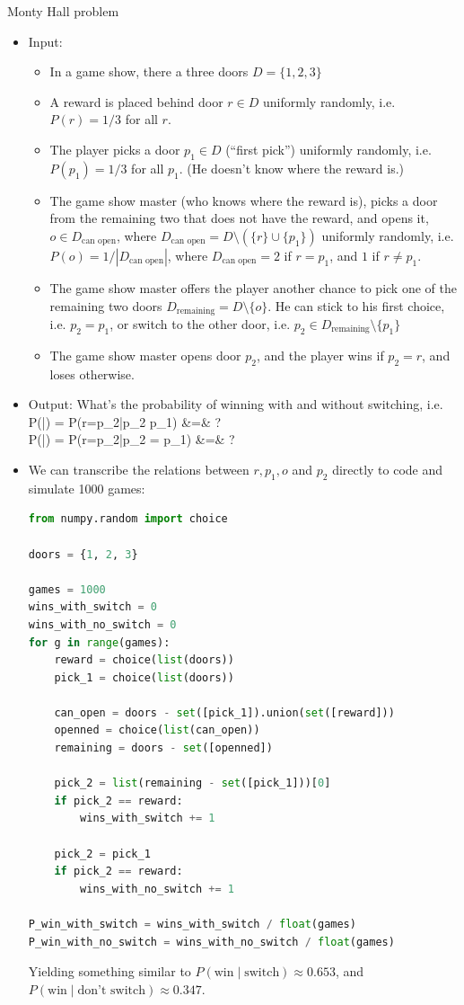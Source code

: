 \newpage
{} Monty Hall problem
\begin{itemize}
	\item Input: 
		\begin{itemize}
			\item In a game show, there a three doors $D = \{1,2,3\}$
			\item A reward is placed behind door $r\in D$ uniformly randomly, i.e. $P(r) = 1/3$ for all $r$.
			\item The player picks a door $p_1 \in D$ (``first pick'') uniformly randomly, i.e. $P(p_1) = 1/3$ for all $p_1$. (He doesn't know where the reward is.)
			\item The game show master (who knows where the reward is), picks a door from the remaining two that does not have the reward, and opens it, $o \in D_\text{can open}$, where $D_\text{can open} = D \setminus (\{r\} \cup \{p_1\})$ uniformly randomly, i.e. $P(o) = 1/ |D_\text{can open}|$, where $D_\text{can open} = 2$ if $r = p_1$, and $1$ if $r\neq p_1$.
			\item The game show master offers the player another chance to pick one of the remaining two doors $D_\text{remaining} = D \setminus \{o\}$. He can stick to his first choice, i.e. $p_2 = p_1$, or switch to the other door, i.e. $p_2 \in D_\text{remaining}\setminus \{p_1\}$
			\item The game show master opens door $p_2$, and the player wins if $p_2 = r$, and loses otherwise.
		\end{itemize}
	\item Output: What's the probability of winning with and without switching, i.e.
	\ba
		P(\;|\;) = P(r=p_2\;|\;p_2 \neq p_1) &=& ?  \\
		P(\;|\;) = P(r=p_2\;|\;p_2 = p_1) &=& ?
	\ea
	\item We can transcribe the relations between $r, p_1, o$ and $p_2$ directly to code and simulate 1000 games:
\begin{lstlisting}[language=python]
from numpy.random import choice

doors = {1, 2, 3}

games = 1000
wins_with_switch = 0
wins_with_no_switch = 0
for g in range(games):
    reward = choice(list(doors))
    pick_1 = choice(list(doors))

    can_open = doors - set([pick_1]).union(set([reward]))
    openned = choice(list(can_open))
    remaining = doors - set([openned])
    
    pick_2 = list(remaining - set([pick_1]))[0]
    if pick_2 == reward:
        wins_with_switch += 1
    
    pick_2 = pick_1
    if pick_2 == reward:
        wins_with_no_switch += 1
        
P_win_with_switch = wins_with_switch / float(games)
P_win_with_no_switch = wins_with_no_switch / float(games)
\end{lstlisting}
Yielding something similar to $P(\text{win}\;|\;\text{switch}) \approx 0.653$, and $P(\text{win}\;|\;\text{don't switch}) \approx 0.347$.

\end{itemize}

